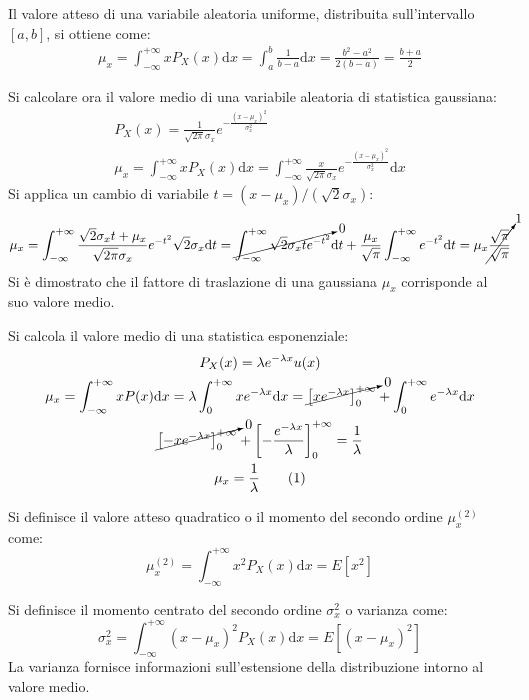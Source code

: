 \documentclass{article}
\newcommand{\df}{\mathrm{d}}
\newcommand{\tageq}{\tag{\stepcounter{equation}\theequation}}
\numberwithin{equation}{subsection}
\begin{document}
Il valore atteso di una variabile aleatoria uniforme, distribuita sull'intervallo $[a,b]$, si ottiene come:
\begin{gather}
    \mu_x=\displaystyle\int_{-\infty}^{+\infty}xP_X(x)\df x=\int_{a}^b\frac{1}{b-a}\df x=\frac{b^2-a^2}{2(b-a)}=\frac{b+a}{2}
\end{gather}


Si calcolare ora il valore medio di una variabile aleatoria di statistica gaussiana:
\begin{gather*}
    P_X(x)=\displaystyle\frac{1}{\sqrt{2\pi}\sigma_x}e^{-\frac{(x-\mu_x)^2}{\sigma_x^2}}\\
    \mu_x=\displaystyle\int_{-\infty}^{+\infty}xP_X(x)\df x=\int_{-\infty}^{+\infty}\frac{x}{\sqrt{2\pi}\sigma_x}e^{-\frac{(x-\mu_x)^2}{\sigma_x^2}}\df x
\end{gather*}
Si applica un cambio di variabile $t=(x-\mu_x)/(\sqrt{2}\sigma_x)$:
\begin{gather*}
    \mu_x=\displaystyle\int_{-\infty}^{+\infty}\frac{\sqrt{2}\sigma_xt+\mu_x}{\sqrt{2\pi}\sigma_x}e^{-t^2}\sqrt{2}\sigma_x\df t=\cancelto{0}{\int_{-\infty}^{+\infty}\sqrt{2}\sigma_xte^{-t^2}}\df t+\frac{\mu_x}{\sqrt{\pi}}\int_{-\infty}^{+\infty}e^{-t^2}\df t=\mu_x\cancelto{1}{\frac{\sqrt{\pi}}{\sqrt{\pi}}}
\end{gather*}
Si è dimostrato che il fattore di traslazione di una gaussiana $\mu_x$ corrisponde al suo valore medio. 


Si calcola il valore medio di una statistica esponenziale:
\begin{gather*}
    P_X(x)=\lambda e^{-\lambda x}u(x)\\
    \mu_x=\displaystyle\int_{-\infty}^{+\infty}xP(x)\df x=\lambda\int_{0}^{+\infty}xe^{-\lambda x}\df x=\cancelto{0}{\left[xe^{-\lambda x}\right]_0^{+\infty}}+\int_0^{+\infty}e^{-\lambda x}\df x\\
    \displaystyle\cancelto{0}{\left[-xe^{-\lambda x}\right]_0^{+\infty}}+\left[-\frac{e^{-\lambda x}}{\lambda}\right]_0^{+\infty}=\frac{1}{\lambda}\\
    \mu_x=\displaystyle\frac{1}{\lambda}\tageq
\end{gather*}

Si definisce il valore atteso quadratico o il momento del secondo ordine $\mu_x^{(2)}$ come:
\begin{equation}
    \mu_x^{(2)}=\displaystyle\int_{-\infty}^{+\infty}x^2P_X(x)\df x=E[x^2]
\end{equation}

Si definisce il momento centrato del secondo ordine $\sigma_x^2$ o varianza come:
\begin{equation}
    \sigma_x^2=\displaystyle\int_{-\infty}^{+\infty}(x-\mu_x)^2P_X(x)\df x=E[(x-\mu_x)^2]
\end{equation}
La varianza fornisce informazioni sull'estensione della distribuzione intorno al valore medio. 
\end{document}
